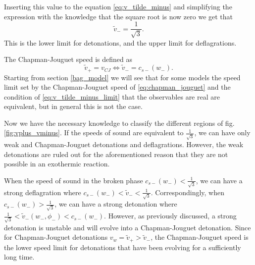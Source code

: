 Inserting this value to the equation \eqref{eq:v_tilde_minus} and simplifying the expression with the knowledge that the square root is now zero
we get that
\begin{equation}
\tilde{v}_- = \frac{1}{\sqrt{3}}.
\label{eq:v_tilde_minus_limit}
\end{equation}
This is the lower limit for detonations, and the upper limit for deflagrations.

The Chapman-Jouguet speed is defined as
\begin{equation}
\tilde{v}_+=v_{CJ} \Leftrightarrow \tilde{v}_- = c_{s-}(w_-).
\label{eq:chapman_jouguet}
\end{equation}
Starting from section \eqref{bag_model} we will see that for some models the speed limit set by the Chapman-Jouguet speed of \eqref{eq:chapman_jouguet}
and the condition of \eqref{eq:v_tilde_minus_limit} that the observables are real are equivalent,
but in general this is not the case.

Now we have the necessary knowledge to classify the different regions of fig. \eqref{fig:vplus_vminus}.
If the speeds of sound are equivalent to $\frac{1}{\sqrt{3}}$,
we can have only weak and Chapman-Jouguet detonations and deflagrations.
However, the weak detonations are ruled out for the aforementioned reason that they are not possible in an exothermic reaction.

When the speed of sound in the broken phase $c_{s-}(w_-) < \frac{1}{\sqrt{3}}$,
we can have a strong deflagration where $c_{s-}(w_-) < \tilde{v}_- < \frac{1}{\sqrt{3}}$.
Correspondingly, when $c_{s-}(w_-) > \frac{1}{\sqrt{3}}$,
we can have a strong detonation where $\frac{1}{\sqrt{3}} < \tilde{v}_-(w_-, \phi_-) < c_{s-}(w_-)$.
However, as previously discussed, a strong detonation is unstable and will evolve into a Chapman-Jouguet detonation.
Since for Chapman-Jouguet detonations $v_w = \tilde{v}_+ > \tilde{v}_-$,
the Chapman-Jouguet speed is the lower speed limit for detonations that have been evolving for a sufficiently long time.
